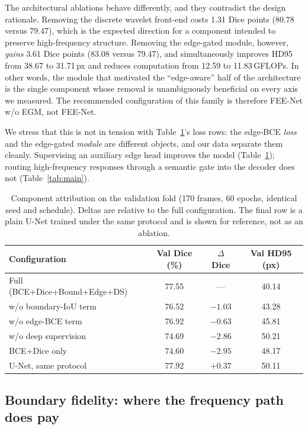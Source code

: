 \documentclass[journal]{IEEEtran}
\begin{document}
The architectural ablations behave differently, and they contradict the design rationale. Removing the discrete wavelet front-end costs 1.31 Dice points (80.78 versus 79.47), which is the expected direction for a component intended to preserve high-frequency structure. Removing the edge-gated module, however, \emph{gains} 3.61 Dice points (83.08 versus 79.47), and simultaneously improves HD95 from 38.67 to 31.71\,px and reduces computation from 12.59 to 11.83\,GFLOPs. In other words, the module that motivated the ``edge-aware'' half of the architecture is the single component whose removal is unambiguously beneficial on every axis we measured. The recommended configuration of this family is therefore FEE-Net w/o EGM, not FEE-Net.

We stress that this is not in tension with Table~\ref{tab:ablation}'s loss rows: the edge-BCE \emph{loss} and the edge-gated \emph{module} are different objects, and our data separate them cleanly. Supervising an auxiliary edge head improves the model (Table~\ref{tab:ablation}); routing high-frequency responses through a semantic gate into the decoder does not (Table~\ref{tab:main}).

\begin{table}[t]
\centering
\caption{Component attribution on the validation fold (170 frames, 60 epochs, identical seed and schedule). Deltas are relative to the full configuration. The final row is a plain U-Net trained under the same protocol and is shown for reference, not as an ablation.}
\label{tab:ablation}
\begin{tabular}{lccc}
\toprule
Configuration & Val Dice (\%) & $\Delta$ Dice & Val HD95 (px) \\
\midrule
Full (BCE+Dice+Bound+Edge+DS) & 77.55 & --- & 40.14 \\
w/o boundary-IoU term & 76.52 & $-1.03$ & 43.28 \\
w/o edge-BCE term & 76.92 & $-0.63$ & 45.81 \\
w/o deep supervision & 74.69 & $-2.86$ & 50.21 \\
BCE+Dice only & 74.60 & $-2.95$ & 48.17 \\
\midrule
U-Net, same protocol & 77.92 & $+0.37$ & 50.11 \\
\bottomrule
\end{tabular}
\end{table}

\subsection{Boundary fidelity: where the frequency path does pay}
\end{document}
